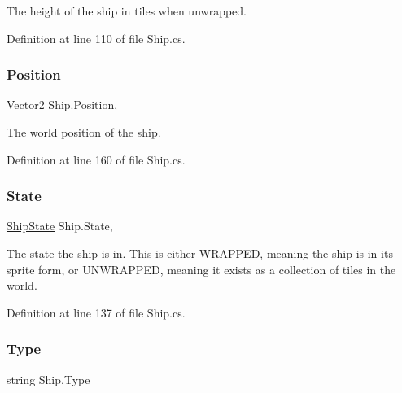 The height of the ship in tiles when unwrapped. 



Definition at line 110 of file Ship.\+cs.

\mbox{\label{class_ship_a462c6c91f5e90055823264eb4f451be8}} 
\subsubsection{\texorpdfstring{Position}{Position}}
{\footnotesize\ttfamily Vector2 Ship.\+Position\hspace{0.3cm}{\ttfamily [get]}, {\ttfamily [set]}}



The world position of the ship. 



Definition at line 160 of file Ship.\+cs.

\mbox{\label{class_ship_a1d15ce4feda27f6f176eedfe576acfe9}} 
\subsubsection{\texorpdfstring{State}{State}}
{\footnotesize\ttfamily \hyperlink{_ship_8cs_a5cc8179225e5abfa75feab8d8b8d13e7}{Ship\+State} Ship.\+State\hspace{0.3cm}{\ttfamily [get]}, {\ttfamily [set]}}



The state the ship is in. This is either W\+R\+A\+P\+P\+ED, meaning the ship is in its sprite form, or U\+N\+W\+R\+A\+P\+P\+ED, meaning it exists as a collection of tiles in the world. 



Definition at line 137 of file Ship.\+cs.

\mbox{\label{class_ship_a2248235d4add6f4f6b4aa2618a705372}} 
\subsubsection{\texorpdfstring{Type}{Type}}
{\footnotesize\ttfamily string Ship.\+Type\hspace{0.3cm}{\ttfamily [get]}}



